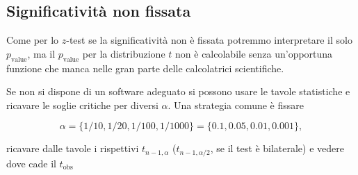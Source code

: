 \documentclass[
  11pt,
]{book}
\theoremstyle{mytheoremstyle}
\theoremstyle{mydefstyle}
\begin{document}
\subsection{Significatività non fissata}\label{significativituxe0-non-fissata-1}

Come per lo \(z\)-test se la significatività non è fissata potremmo interpretare il solo
\(p_\text{value}\), ma il \(p_\text{value}\) per la distribuzione \(t\) non è calcolabile
senza un'opportuna funzione che manca nelle gran parte delle calcolatrici scientifiche.

Se non si dispone di un software adeguato si possono usare le tavole statistiche
e ricavare le soglie critiche per diversi \(\alpha\). Una strategia comune è fissare

\[
  \alpha=\{1/10,1/20,1/100,1/1000\}=\{0.1,0.05,0.01,0.001\},
\]

ricavare dalle tavole i rispettivi \(t_{n-1,\alpha}\) (\(t_{n-1,\alpha/2}\), se il
test è bilaterale) e vedere dove cade il \(t_\text{obs}\)
\end{document}
